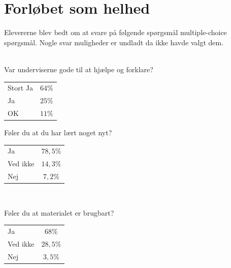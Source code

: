 \documentclass{article}
\begin{document}
    \section{Forløbet som helhed}
        Elevererne blev bedt om at svare på følgende spørgsmål multiple-choice
        spørgsmål. Nogle svar muligheder er undladt da ikke havde valgt dem.\\
        ~\\
            \begin{minipage}[t]{0.5\textwidth}
                \begin{center}
                    Var underviserne gode til at hjælpe og forklare?
                    \begin{tabular}{ | l | c |}
                        \hline
                        Stort Ja & $64\%$ \\
                        Ja       & $25\%$ \\
                        OK       & $11\%$ \\ \hline
                    \end{tabular}
                \end{center}
            \end{minipage}
            \begin{minipage}[t]{0.5\textwidth}
                Føler du at du har lært noget nyt?
                \begin{center}
                    \begin{tabular}{| l | c |}
                        \hline
                        Ja         & $78,5\%$ \\
                        Ved ikke   & $14,3\%$ \\
                        Nej        & $7,2\%$ \\ \hline
                    \end{tabular}
                \end{center}
            \end{minipage}
            \\
            \begin{minipage}[t]{0.5\textwidth}
                \begin{center}
                Føler du at materialet er brugbart?
                    \begin{tabular}{ |l | c |}
                        \hline
                        Ja         & $68\%$ \\
                        Ved ikke   & $28,5\%$ \\
                        Nej        & $3,5\%$ \\ \hline
                    \end{tabular}
                \end{center}
            \end{minipage}
\end{document}
